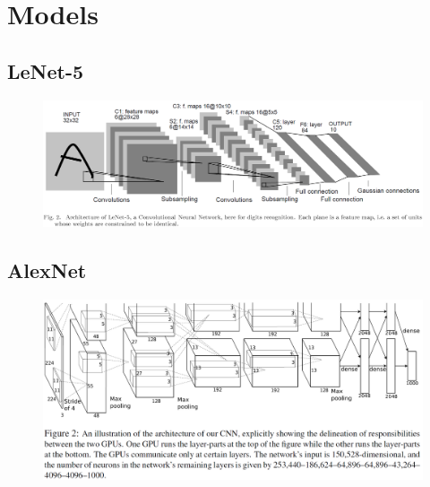 \chapter{Models}
\section{LeNet-5}
\begin{figure}[H]
    \centering
    \includegraphics[width=16cm]{images/models/lenet-5.png}
    \label{fig:lenet-5}
\end{figure}

\section{AlexNet}
\begin{figure}[H]
    \centering
    \includegraphics[width=16cm]{images/models/alexnet.png}
    \label{fig:alexnet}
\end{figure}


